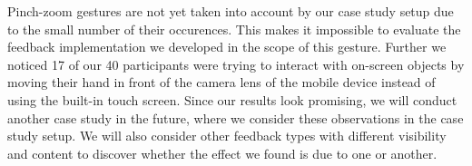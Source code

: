 \documentclass[manuscript]{acmart}
\begin{document}
		Pinch-zoom gestures are not yet taken into account by our case study setup due to the small number of their occurences. This makes it impossible to evaluate the feedback implementation we developed in the scope of this gesture. Further we noticed 17 of our 40 participants were trying to interact with on-screen objects by moving their hand in front of the camera lens of the mobile device instead of using the built-in touch screen. Since our results look promising, we will conduct another case study in the future, where we consider these observations in the case study setup. We will also consider other feedback types with different visibility and content to discover whether the effect we found is due to one or another.

	
	
\end{document}
